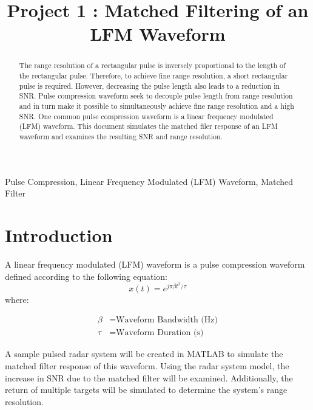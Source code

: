 \documentclass[conference]{IEEEtran}
\begin{document}
\title{Project 1 : Matched Filtering of an LFM Waveform}

\author{
}
\maketitle

\begin{abstract}
The range resolution of a rectangular pulse is inversely proportional to the length of the rectangular pulse. Therefore, to achieve fine range resolution, a short rectangular pulse is required. However, decreasing the pulse length also leads to a reduction in SNR. Pulse compression waveform seek to decouple pulse length from range resolution and in turn make it possible to simultaneously achieve fine range resolution and a high SNR. One common pulse compression waveform is a linear frequency modulated (LFM) waveform. This document simulates the matched filer response of an LFM waveform and examines the resulting SNR and range resolution.
\end{abstract}

\begin{IEEEkeywords}
Pulse Compression, Linear Frequency Modulated (LFM) Waveform, Matched Filter
\end{IEEEkeywords}
\section{Introduction}
A linear frequency modulated (LFM) waveform is a pulse compression waveform defined according to the following equation:
\begin{equation}
x(t)=e^{j\pi\beta t^2/\tau}
\label{lfm_waveform}
\end{equation}
where:
\begin{fleqn}[\parindent]
\begin{align*}
\beta &= \text{Waveform Bandwidth (Hz)}\\
\tau &= \text{Waveform Duration (s)}
\end{align*}
\end{fleqn}
A sample pulsed radar system will be created in MATLAB to simulate the matched filter response of this waveform. Using the radar system model, the increase in SNR due to the matched filter will be examined. Additionally, the return of multiple targets will be simulated to determine the system's range resolution.
\end{document}
